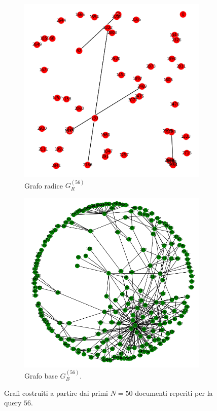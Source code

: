 \begin{figure}
	\centering
	\begin{subfigure}{.5\textwidth}
		\centering
		\includegraphics[width=1\textwidth]{figures/R.png}
		\caption{Grafo radice $G_R^{(56)}$}
		\label{fig:uno}
	\end{subfigure}%
	\begin{subfigure}{.5\textwidth}
		\centering
		\includegraphics[width=1\textwidth]{figures/B.png}
		\caption{Grafo base $G_B^{(56)}$.}
		\label{fig:due}
	\end{subfigure}
	\caption{Grafi costruiti a partire dai primi $N=50$ documenti reperiti per la query $56$.}
	\label{fig:hitsexpansion}
\end{figure}

